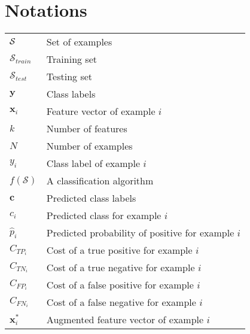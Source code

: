 
\chapter{Notations}
	
\begin{tabularx}{\textwidth}{ l X }
$\cal S$ 		& Set of examples \\ 
$\mathcal{S}_{train}$ 	& Training set\\
$\mathcal{S}_{test}$ 	& Testing set \\
$\mathbf{y}$ 		& Class labels  \\  
$\mathbf{x}_i$ 		& Feature vector of example $i$ \\
$k$ 			& Number of features  \\
$N $ 			& Number of examples 	 \\
$y_i$ 			& Class label of example $i$  \\
$f(\mathcal{S})$ 	& A classification algorithm 	 \\
$\mathbf{c}$ 		& Predicted class labels \\  
$c_i$ 			& Predicted class for example $i$   \\
$\hat p_i$		& Predicted probability of positive for example $i$  \\
$C_{TP_i}$		& Cost of a true positive for example $i$	 \\
$C_{TN_i}$		& Cost of a true negative for example $i$	 \\	
$C_{FP_i}$		& Cost of a false positive for example $i$	 \\	
$C_{FN_i}$		& Cost of a false negative for example $i$	 \\	
$\mathbf{x}_i^*$ 	& Augmented feature vector of example $i$ \\	
\end{tabularx}
